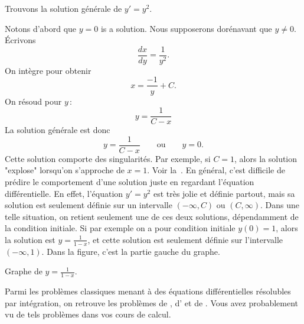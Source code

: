 \begin{example}
Trouvons la solution générale de
$y' = y^2$.

Notons d'abord que $y=0$ is a solution.  Nous supposerons dorénavant que $y \not= 0$.
Écrivons 
\begin{equation*}
\frac{dx}{dy} = \frac{1}{y^2} .
\end{equation*}
On intègre pour obtenir 
\begin{equation*}
x = \frac{-1}{y} + C .
\end{equation*}
On résoud pour $y$\,:
\begin{equation*}
y = \frac{1}{C-x}
\end{equation*}
La solution générale est donc 
\begin{equation*}
y = \frac{1}{C-x} \qquad \text{ou} \qquad y = 0.
\end{equation*}
Cette solution comporte des singularités. Par exemple, si $C=1$, alors la solution "explose" lorsqu'on s'approche de $x=1$.
Voir la~.  En général, c'est difficile de prédire le comportement d'une solution juste en regardant l'équation différentielle.  En effet, l'équation $y' = y^2$ est très jolie et définie partout, mais sa solution est seulement définie sur un intervalle $(-\infty, C)$ ou
$(C, \infty)$.  Dans une telle situation, on retient seulement une de ces deux solutions, dépendamment de la condition initiale.  Si par exemple on a pour condition initiale $y(0) = 1$, alors la solution est $y=\frac{1}{1-x}$, et cette solution est seulement définie sur l'intervalle  $(-\infty,1)$. Dans la figure, c'est la partie gauche du graphe.

\begin{myfig}
\capstart
{}
\caption{Graphe de $y=\frac{1}{1-x}$.\label{1over1mx:fig}}
\end{myfig}
\end{example}

Parmi les problèmes classiques menant à des équations différentielles résolubles par intégration, on retrouve les problèmes de ,
d' et de  .  Vous avez probablement vu de tels problèmes dans vos cours de calcul.

